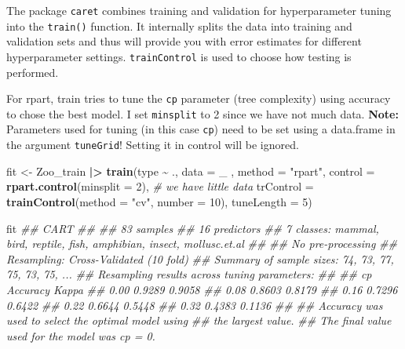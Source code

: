 \documentclass[
  notitlepage]{book}
\newenvironment{Shaded}{\begin{snugshade}}{\end{snugshade}}
\newcommand{\CommentTok}[1]{\textcolor[rgb]{0.56,0.35,0.01}{\textit{#1}}}
\newcommand{\DataTypeTok}[1]{\textcolor[rgb]{0.13,0.29,0.53}{#1}}
\newcommand{\DecValTok}[1]{\textcolor[rgb]{0.00,0.00,0.81}{#1}}
\newcommand{\ErrorTok}[1]{\textcolor[rgb]{0.64,0.00,0.00}{\textbf{#1}}}
\newcommand{\KeywordTok}[1]{\textcolor[rgb]{0.13,0.29,0.53}{\textbf{#1}}}
\newcommand{\NormalTok}[1]{#1}
\newcommand{\OperatorTok}[1]{\textcolor[rgb]{0.81,0.36,0.00}{\textbf{#1}}}
\newcommand{\StringTok}[1]{\textcolor[rgb]{0.31,0.60,0.02}{#1}}
\begin{document}
The package \texttt{caret} combines training and validation for hyperparameter
tuning into the \texttt{train()} function. It internally splits the
data into training and validation sets and thus will provide you with
error estimates for different hyperparameter settings. \texttt{trainControl} is
used to choose how testing is performed.

For rpart, train tries to tune the \texttt{cp} parameter (tree complexity)
using accuracy to chose the best model. I set \texttt{minsplit} to 2 since we
have not much data. \textbf{Note:} Parameters used for tuning (in this case
\texttt{cp}) need to be set using a data.frame in the argument \texttt{tuneGrid}!
Setting it in control will be ignored.

\begin{Shaded}
\begin{Highlighting}[]
\NormalTok{fit \textless{}{-}}\StringTok{ }\NormalTok{Zoo\_train }\OperatorTok{|}\ErrorTok{\textgreater{}}
\StringTok{  }\KeywordTok{train}\NormalTok{(type }\OperatorTok{\textasciitilde{}}\StringTok{ }\NormalTok{.,}
    \DataTypeTok{data =}\NormalTok{ \_ ,}
    \DataTypeTok{method =} \StringTok{"rpart"}\NormalTok{,}
    \DataTypeTok{control =} \KeywordTok{rpart.control}\NormalTok{(}\DataTypeTok{minsplit =} \DecValTok{2}\NormalTok{), }\CommentTok{\# we have little data}
    \DataTypeTok{trControl =} \KeywordTok{trainControl}\NormalTok{(}\DataTypeTok{method =} \StringTok{"cv"}\NormalTok{, }\DataTypeTok{number =} \DecValTok{10}\NormalTok{),}
    \DataTypeTok{tuneLength =} \DecValTok{5}\NormalTok{)}

\NormalTok{fit}
\CommentTok{\#\# CART }
\CommentTok{\#\# }
\CommentTok{\#\# 83 samples}
\CommentTok{\#\# 16 predictors}
\CommentTok{\#\#  7 classes: \textquotesingle{}mammal\textquotesingle{}, \textquotesingle{}bird\textquotesingle{}, \textquotesingle{}reptile\textquotesingle{}, \textquotesingle{}fish\textquotesingle{}, \textquotesingle{}amphibian\textquotesingle{}, \textquotesingle{}insect\textquotesingle{}, \textquotesingle{}mollusc.et.al\textquotesingle{} }
\CommentTok{\#\# }
\CommentTok{\#\# No pre{-}processing}
\CommentTok{\#\# Resampling: Cross{-}Validated (10 fold) }
\CommentTok{\#\# Summary of sample sizes: 74, 73, 77, 75, 73, 75, ... }
\CommentTok{\#\# Resampling results across tuning parameters:}
\CommentTok{\#\# }
\CommentTok{\#\#   cp    Accuracy  Kappa }
\CommentTok{\#\#   0.00  0.9289    0.9058}
\CommentTok{\#\#   0.08  0.8603    0.8179}
\CommentTok{\#\#   0.16  0.7296    0.6422}
\CommentTok{\#\#   0.22  0.6644    0.5448}
\CommentTok{\#\#   0.32  0.4383    0.1136}
\CommentTok{\#\# }
\CommentTok{\#\# Accuracy was used to select the optimal model using}
\CommentTok{\#\#  the largest value.}
\CommentTok{\#\# The final value used for the model was cp = 0.}
\end{Highlighting}
\end{Shaded}
\end{document}
